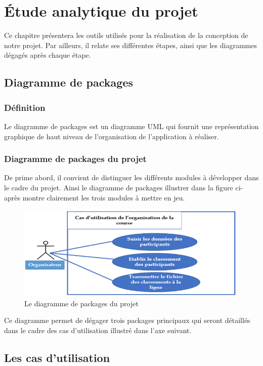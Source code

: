 \section {Étude analytique du projet}

Ce chapitre présentera les outils utilisés pour la réalisation de la conception de notre projet. Par ailleurs, il relate ses différentes étapes, ainsi que les diagrammes dégagés après chaque étape.


\subsection {Diagramme de packages }
\subsubsection{Définition}
Le diagramme de packages est un diagramme UML qui fournit une représentation graphique de haut niveau de l'organisation de l’application à réaliser.
\subsubsection{Diagramme de packages du projet}
De prime abord, il convient de distinguer les différents modules à développer dans le cadre du projet. Ainsi le diagramme de packages illustrer dans la figure ci-après montre clairement les trois modules à mettre en jeu.
\begin{figure}[!h]
	   \center
	   \includegraphics[scale=0.9]{img/Diagramme_de_packages.png}
	   \caption {Le diagramme de packages du projet}
\end{figure}

Ce diagramme permet de dégager trois packages principaux qui seront détaillés dans le cadre des cas d’utilisation illustré dans l’axe suivant.

\subsection {Les cas d’utilisation}

